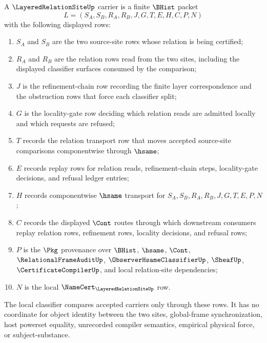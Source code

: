 \begin{definition}
\label{def:layered-relation-site-carrier}
A $\LayeredRelationSiteUp$ carrier is a finite $\BHist$ packet
$$
L=(S_A,S_B,R_A,R_B,J,G,T,E,H,C,P,N)
$$
with the following displayed rows:
\begin{enumerate}
\item $S_A$ and $S_B$ are the two source-site rows whose relation is being certified;
\item $R_A$ and $R_B$ are the relation rows read from the two sites, including the displayed classifier surfaces consumed by the comparison;
\item $J$ is the refinement-chain row recording the finite layer correspondence and the obstruction rows that force each classifier split;
\item $G$ is the locality-gate row deciding which relation reads are admitted locally and which requests are refused;
\item $T$ records the relation transport row that moves accepted source-site comparisons componentwise through $\hsame$;
\item $E$ records replay rows for relation reads, refinement-chain steps, locality-gate decisions, and refusal ledger entries;
\item $H$ records componentwise $\hsame$ transport for $S_A,S_B,R_A,R_B,J,G,T,E,P,N$;
\item $C$ records the displayed $\Cont$ routes through which downstream consumers replay relation rows, refinement rows, locality decisions, and refusal rows;
\item $P$ is the $\Pkg$ provenance over $\BHist$, $\hsame$, $\Cont$, $\RelationalFrameAuditUp$, $\ObserverHsameClassifierUp$, $\SheafUp$, $\CertificateCompilerUp$, and local relation-site dependencies;
\item $N$ is the local $\NameCert_{\LayeredRelationSiteUp}$ row.
\end{enumerate}
The local classifier compares accepted carriers only through these rows. It has no coordinate for object identity between the two sites, global-frame synchronization, host powerset equality, unrecorded compiler semantics, empirical physical force, or subject-substance.
\end{definition}

